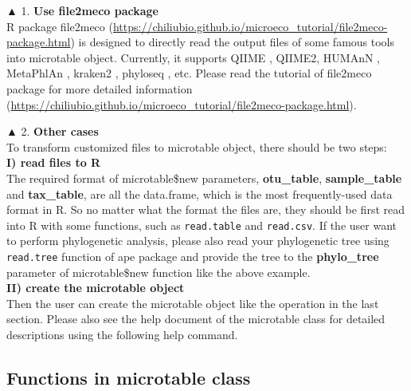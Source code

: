 \documentclass[
]{book}
\newenvironment{Shaded}{\begin{snugshade}}{\end{snugshade}}
\newcommand{\CommentTok}[1]{\textcolor[rgb]{0.56,0.35,0.01}{\textit{#1}}}
\newcommand{\NormalTok}[1]{#1}
\begin{document}
▲ 1. \textbf{Use file2meco package}\\
R package file2meco (\url{https://chiliubio.github.io/microeco_tutorial/file2meco-package.html}) is designed to directly read the output files of some famous tools into microtable object.
Currently, it supports QIIME \citep{Caporaso_QIIME_2010}, QIIME2\citep{Bolyen_Reproducible_2019},
HUMAnN \citep{Franzosa_Species_2018}, MetaPhlAn \citep{Blanco_MetaPhlAn_2023}, kraken2 \citep{Wood_Improved_2019}, phyloseq \citep{Mcmurdie_phyloseq_2013}, etc.
Please read the tutorial of file2meco package for more detailed information (\url{https://chiliubio.github.io/microeco_tutorial/file2meco-package.html}).

▲ 2. \textbf{Other cases}\\
To transform customized files to microtable object,
there should be two steps:\\
\textbf{I) read files to R}\\
The required format of microtable\$new parameters, \textbf{otu\_table}, \textbf{sample\_table} and \textbf{tax\_table}, are all the data.frame, which is the most frequently-used data format in R.
So no matter what the format the files are, they should be first read into R with some functions, such as \texttt{read.table} and \texttt{read.csv}.
If the user want to perform phylogenetic analysis, please also read your phylogenetic tree using \texttt{read.tree} function of ape package and
provide the tree to the \textbf{phylo\_tree} parameter of microtable\$new function like the above example.\\
\textbf{II) create the microtable object}\\
Then the user can create the microtable object like the operation in the last section.
Please also see the help document of the microtable class for detailed descriptions using the following help command.

\begin{Shaded}
\end{Shaded}

\subsection{Functions in microtable class}\label{functions-in-microtable-class}
\end{document}
